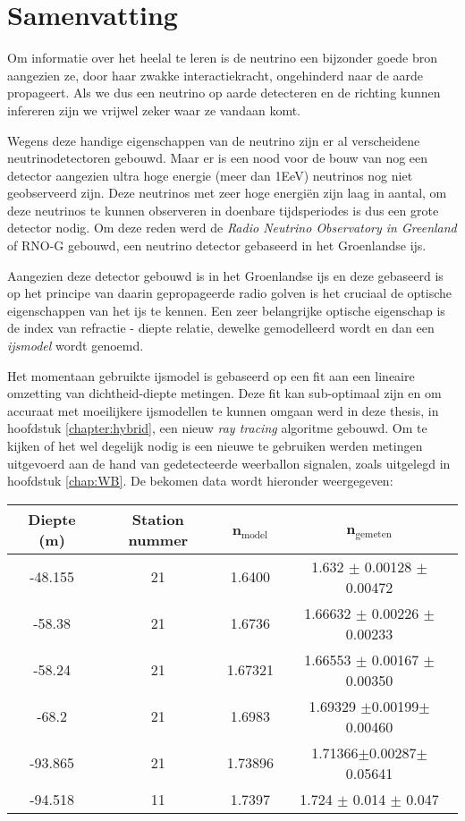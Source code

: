 \chapter*{Samenvatting}
Om informatie over het heelal te leren is de neutrino een bijzonder goede bron aangezien
ze, door haar zwakke interactiekracht, ongehinderd naar de aarde propageert.
Als we dus een neutrino op aarde detecteren en de richting kunnen infereren zijn we
vrijwel zeker waar ze vandaan komt.

Wegens deze handige eigenschappen van de neutrino zijn er al verscheidene neutrinodetectoren gebouwd.
Maar er is een nood voor de bouw van nog een detector aangezien ultra hoge energie (meer dan 1EeV) neutrinos
nog niet geobserveerd zijn. Deze neutrinos met zeer hoge energiën zijn laag in aantal,
om deze neutrinos te kunnen observeren in doenbare tijdsperiodes is dus een grote detector nodig.
Om deze reden werd de \textit{Radio Neutrino Observatory in Greenland} of RNO-G gebouwd, een 
neutrino detector gebaseerd in het Groenlandse ijs.

Aangezien deze detector gebouwd is in het Groenlandse ijs en deze gebaseerd is
op het principe van daarin gepropageerde radio golven is het cruciaal de
optische eigenschappen van het ijs te kennen. Een zeer belangrijke optische
eigenschap is de index van refractie - diepte relatie, dewelke gemodelleerd wordt
en dan een \textit{ijsmodel} wordt genoemd.

Het momentaan gebruikte ijsmodel is gebaseerd op een fit aan een lineaire omzetting van dichtheid-diepte metingen.
Deze fit kan sub-optimaal zijn en om accuraat met moeilijkere ijsmodellen
te kunnen omgaan werd in deze thesis, in hoofdstuk \ref{chapter:hybrid}, een nieuw \textit{ray tracing}
algoritme gebouwd. Om te kijken of het wel degelijk nodig is een nieuwe te gebruiken werden 
metingen uitgevoerd aan de hand van gedetecteerde weerballon signalen, zoals uitgelegd in hoofdstuk \ref{chap:WB}. 
De bekomen data wordt hieronder weergegeven:
\begin{center}
\begin{tabular}{||c c c c||}
 \hline
 Diepte (m) & Station nummer & n$_\text{model}$ & n$_\text{gemeten}$\\ [0.5ex]
 \hline\hline
 -48.155 & 21 & 1.6400 & 1.632 $\pm$ 0.00128 $\pm$ 0.00472\\
 -58.38 & 21 & 1.6736 & 1.66632 $\pm$ 0.00226 $\pm$ 0.00233 \\
 -58.24 & 21 & 1.67321 & 1.66553 $\pm$ 0.00167 $\pm$ 0.00350 \\
 -68.2 & 21 & 1.6983 & 1.69329 $\pm$0.00199$\pm$0.00460 \\
 -93.865 & 21 & 1.73896 & 1.71366$\pm$0.00287$\pm$0.05641\\
 -94.518 & 11 & 1.7397 & 1.724 $\pm$ 0.014 $\pm$ 0.047 \\
 \hline
\end{tabular}
\end{center}
